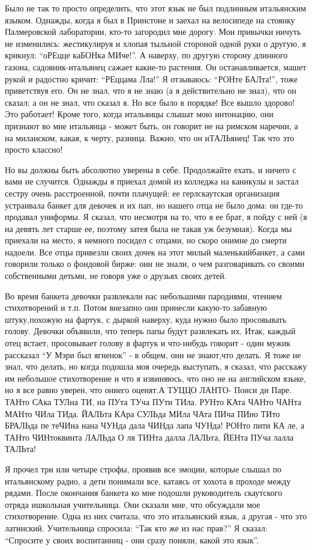 \documentclass[11pt,]{article}
\begin{document}
Было не так то просто определить, что этот язык не был подлинным
итальянским языком. Однажды, когда я был в Принстоне и заехал на
велосипеде на стоянку Палмеровской лаборатории, кто-то загородил мне
дорогу. Мои привычки ничуть не изменились: жестикулируя и хлопая тыльной
стороной одной руки о другую, я крикнул: ``оРЕцце каБОНка МИче!''. А
наверху, по другую сторону длинного газона, садовник-итальянец сажает
какие-то растения. Он останавливается, машет рукой и радостно кричит:
``РЕццама Лла!'' Я отзываюсь: ``РОНте БАЛта!'', тоже приветствуя его. Он
не знал, что я не знаю (а я действительно не знал), что он сказал; а он
не знал, что сказал я. Но все было в порядке! Все вышло здорово! Это
работает! Кроме того, когда итальянцы слышат мою интонацию, они признают
во мне итальянца - может быть, он говорит не на римском наречии, а на
миланском, какая, к черту, разница. Важно, что он иТАЛЬянец! Так что это
просто классно!

Но вы должны быть абсолютно уверены в себе. Продолжайте ехать, и ничего
с вами не случится. Однажды я приехал домой из колледжа на каникулы и
застал сестру очень расстроенной, почти плачущей: ее герлскаутская
организация устраивала банкет для девочек и их пап, но нашего отца не
было дома: он где-то продавал униформы. Я сказал, что несмотря на то,
что я ее брат, я пойду с ней (я на девять лет старше ее, поэтому затея
была не такая уж безумная). Когда мы приехали на место, я немного
посидел с отцами, но скоро онимне до смерти надоели. Все отцы привезли
своих дочек на этот милый маленькийбанкет, а сами говорили только о
фондовой бирже: они не знали, о чем разговаривать со своими собственными
детьми, не говоря уже о друзьях своих детей.

Во время банкета девочки развлекали нас небольшими пародиями, чтением
стихотворений и т.п. Потом внезапно они принесли какую-то забавную
штуку,похожую на фартук, с дыркой наверху, куда нужно было просовывать
голову. Девочки объявили, что теперь папы будут развлекать их. Итак,
каждый отец встает, просовывает голову в фартук и что-нибудь говорит -
один мужик рассказал ``У Мэри был ягненок'' - в общем, они не знают,что
делать. Я тоже не знал, что делать, но когда подошла моя очередь
выступать, я сказал, что расскажу им небольшое стихотворение и что я
извиняюсь, что оно не на английском языке, но я все равно уверен, что
ониего оценят.А ТУЦЦО ЛАНТО- Поиси ди Паре. ТАНто САка ТУЛна ТИ, на ПУта
ТУча ПУти ТИла. РУНто КАта ЧАНто ЧАНта МАНто ЧИла ТИда. ЙАЛЬта КАра
СУЛЬда МИла ЧАта ПИча ПИно ТИто БРАЛЬда пе теЧИна нана ЧУНда дала ЧИНда
лапа ЧУНда! РОНто пити КА ле, а ТАНто ЧИНтоквинта ЛАЛЬда О ля ТИНта
далла ЛАЛЬта, ЙЕНта ПУча лалла ТАЛЬта!

Я прочел три или четыре строфы, проявив все эмоции, которые слышал по
итальянскому радио, а дети понимали все, катаясь от хохота в проходе
между рядами. После окончания банкета ко мне подошли руководитель
скаутского отряда ишкольная учительница. Они сказали мне, что обсуждали
мое стихотворение. Одна из них считала, что это итальянский язык, а
другая - что это латинский. Учительница спросила: ``Так кто же из нас
прав?'' Я сказал: ``Спросите у своих воспитанниц - они сразу поняли,
какой это язык''.

\newpage


\end{document}
